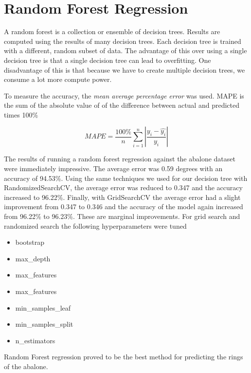 \section{Random Forest Regression}

A random forest is a collection or ensemble of decision trees. Results are computed using  the results of many decision trees. Each decision tree is trained with a different, random subset of data. The advantage of this over using a single decision tree is that a single decision tree can lead to overfitting. One disadvantage of this is that because we have to create multiple decision trees, we consume a lot more compute power.

To measure the accuracy, the \textit{mean average percentage error} was used. MAPE is the sum of the absolute value of of the difference between actual and predicted times 100\%

\begin{equation}\label{eq_mape}
MAPE = \frac{100\%}{n}\sum\limits_{i=1}^n\left|\frac{y_i-\hat{y_i}}{y_i} \right|
\end{equation}

The results of running a random forest regression against the abalone dataset were immediately impressive. The average error was 0.59 degrees with an accuracy of 94.53\%. Using the same techniques we used for our decision tree with RandomizedSearchCV, the average error was reduced to 0.347 and the accuracy increased to 96.22\%. Finally, with GridSearchCV the average error had a slight improvement from 0.347 to 0.346 and the accuracy of the model again increased from 96.22\% to 96.23\%. These are marginal improvements. For grid search and randomized search the following hyperparameters were tuned

\begin{itemize}
  \item bootstrap
  \item max\_depth
  \item max\_features
  \item max\_features
  \item min\_samples\_leaf
  \item min\_samples\_split
  \item n\_estimators
\end{itemize}

Random Forest regression proved to be the best method for predicting the rings of the abalone.

